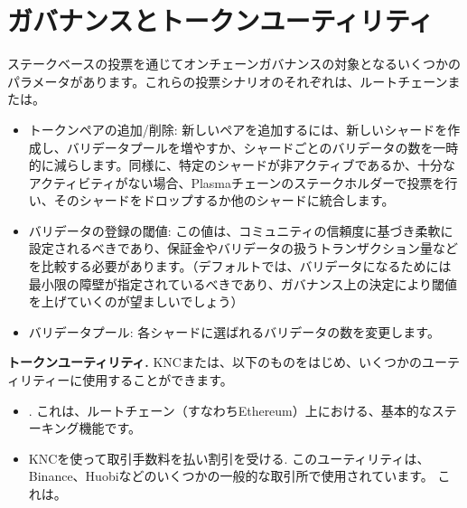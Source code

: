 \section{ガバナンスとトークンユーティリティ}
ステークベースの投票を通じてオンチェーンガバナンスの対象となるいくつかのパラメータがあります。これらの投票シナリオのそれぞれは、ルートチェーンまたは。

\begin{itemize}
\item トークンペアの追加/削除: 新しいペアを追加するには、新しいシャードを作成し、バリデータプールを増やすか、シャードごとのバリデータの数を一時的に減らします。同様に、特定のシャードが非アクティブであるか、十分なアクティビティがない場合、Plasmaチェーンのステークホルダーで投票を行い、そのシャードをドロップするか他のシャードに統合します。

\item バリデータの登録の閾値: この値は、コミュニティの信頼度に基づき柔軟に設定されるべきであり、保証金やバリデータの扱うトランザクション量などを比較する必要があります。（デフォルトでは、バリデータになるためには最小限の障壁が指定されているべきであり、ガバナンス上の決定により閾値を上げていくのが望ましいでしょう）

\item バリデータプール: 各シャードに選ばれるバリデータの数を変更します。

\end{itemize}
\textbf{トークンユーティリティ.} KNCまたは、以下のものをはじめ、いくつかのユーティリティーに使用することができます。
\begin{itemize}
\item {}. これは、ルートチェーン（すなわちEthereum）上における、基本的なステーキング機能です。
\item KNCを使って取引手数料を払い割引を受ける. このユーティリティは、Binance、Huobiなどのいくつかの一般的な取引所で使用されています。 これは。
\end{itemize}
